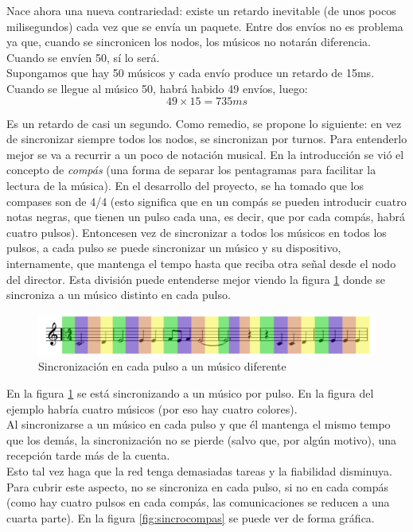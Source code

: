Nace ahora una nueva contrariedad: existe un retardo inevitable (de unos pocos milisegundos)
cada vez que se envía un paquete. Entre dos envíos no es problema ya que, cuando
se sincronicen los nodos, los músicos no notarán diferencia. Cuando se envíen 50, sí lo será.\\

Supongamos que hay 50 músicos y cada envío produce un retardo de 15ms. Cuando se llegue al músico
50, habrá habido 49 envíos, luego:
\[
  49 \times 15 = 735ms
\]

Es un retardo de casi un segundo. Como remedio, se propone lo siguiente: en vez de
sincronizar siempre todos los nodos, se sincronizan por turnos. Para entenderlo mejor se
va a recurrir a un poco de notación musical. En la introducción se vió el concepto de \textit{compás}
(una forma de separar los pentagramas para facilitar la lectura de la música). En el desarrollo
del proyecto, se ha tomado que los compases son de 4/4 (esto significa que en un compás se pueden introducir
cuatro notas negras, que tienen un pulso cada una, es decir, que por cada compás,
habrá cuatro pulsos). Entoncesen vez de sincronizar a todos los músicos en todos los pulsos,
a cada pulso se puede sincronizar un músico y su dispositivo, internamente, que mantenga el tempo hasta
que reciba otra señal desde el nodo del director. Esta división puede entenderse mejor viendo
la figura \ref{fig:sincronotas} donde se sincroniza a un músico distinto en cada pulso.

\begin{figure}[!htb]
\centering
\includegraphics[width=1\textwidth]{./imagenes/sincronotas}
\caption{Sincronización en cada pulso a un músico diferente} \label{fig:sincronotas}
\end{figure}

En la figura \ref{fig:sincronotas} se está sincronizando a un músico por pulso. En
la figura del ejemplo habría cuatro músicos (por eso hay cuatro colores).\\

Al sincronizarse a un músico en cada pulso y que él mantenga el mismo tempo que los demás,
la sincronización no se pierde (salvo que, por algún motivo), una recepción tarde más de
la cuenta.\\

Esto tal vez haga que la red tenga demasiadas tareas y la fiabilidad disminuya. Para
cubrir este aspecto, no se sincroniza en cada pulso, si no en cada compás (como hay
cuatro pulsos en cada compás, las comunicaciones se reducen a una cuarta parte).
En la figura \ref{fig:sincrocompas} se puede ver de forma gráfica.\\

